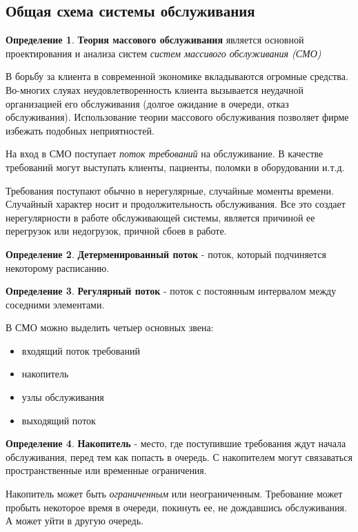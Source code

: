 \documentclass[aps,%
12pt,%
final,%
oneside,
onecolumn,%
musixtex, %
superscriptaddress,%
centertags]{article} %
\theoremstyle{plain}
\theoremstyle{definition}
\newtheorem{definition}{Определение}[subsection]
\theoremstyle{remark}
\begin{document}
\subsection{Общая схема системы обслуживания}

\begin{definition}
	\textbf{Теория массового обслуживания} является основной проектирования и анализа систем \textit{систем массивого обслуживания (СМО)}
\end{definition}

В борьбу за клиента в современной экономике вкладываются огромные средства. Во-многих слуяах неудовлетворенность клиента вызывается неудачной организацией его обслуживания (долгое ожидание в очереди, отказ обслуживания). Использование теории массового обслуживания позволяет фирме избежать подобных неприятностей.

На вход в \textsc{СМО} поступает \textit{поток требований} на обслуживание. В качестве требований могут выступать клиенты, пациенты, поломки в оборудовании и.т.д.

Требования поступают обычно в нерегулярные, случайные моменты времени. Случайный характер носит и продолжительность обслуживания. Все это создает нерегулярности в работе обслуживающей системы, является причиной ее перегрузок или недогрузок, причной сбоев в работе.

\begin{definition}
	\textbf{Детерменированный поток} - поток, который подчиняется некоторому расписанию.
\end{definition}
\begin{definition}
	\textbf{Регулярный поток} - поток с постоянным интервалом между соседними элементами.
\end{definition}

В \textsc{СМО} можно выделить четыер основных звена:

\begin{itemize}
	\item входящий поток требований
	\item накопитель
	\item узлы обслуживания
	\item выходящий поток
\end{itemize}

\begin{definition}
	\textbf{Накопитель} - место, где поступившие требования ждут начала обслуживания, перед тем как попасть в очередь. С накопителем могут связаваться пространственные или временные ограничения. 

	Накопитель может быть \textit{ограниченным} или неограниченным. Требование может пробыть некоторое время в очереди, покинуть ее, не дождавшись обслуживания. А может уйти в другую очередь.
\end{definition}
\end{document}
